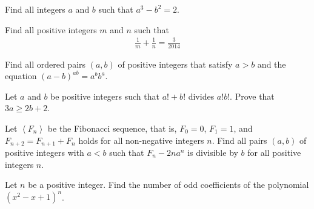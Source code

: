 \begin{problem}
	Find all integers $a$ and $b$ such that $a^3 - b^2 = 2$.
\end{problem}

\begin{problem}
	Find all positive integers $m$ and $n$ such that
	\begin{align*}
		\frac{1}{m} + \frac{1}{n} = \frac{3}{2014}
	\end{align*}
\end{problem}

\begin{problem}
	Find all ordered pairs $(a,b)$ of positive integers that satisfy $a>b$ and the equation $(a-b)^{ab}=a^bb^a$. %
\end{problem}

\begin{problem}
	Let $a$ and $b$ be positive integers such that $a! + b!$ divides $a!b!$. Prove that $3a \ge 2b + 2$. %
\end{problem}

\begin{problem}
	Let $\left< F_n\right>$ be the Fibonacci sequence, that is, $F_0=0$, $F_1=1$, and $F_{n+2}=F_{n+1}+F_{n}$ holds for all non-negative integers $n$.
	Find all pairs $(a,b)$ of positive integers with $a < b$ such that $F_n-2na^n$ is divisible by $b$ for all positive integers $n$. %
\end{problem}

\begin{problem}
	Let $n$ be a positive integer. Find the number of odd coefficients of the polynomial $(x^2-x+1)^n$. %
\end{problem}

